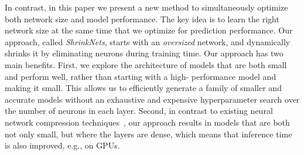 In contrast, in this paper we present a new method to simultaneously optimize
both network size and model performance. The key idea is to learn the right
network size at the same time that we optimize for prediction performance. Our
approach, called {\it ShrinkNets}, starts with an {\it oversized} network, and
dynamically shrinks it by eliminating neurons during training time.  Our
approach has two main benefits.  First, we explore the architecture of models
that are both small and perform well, rather than starting with a high-
performance model and making it small.  This allows us to efficiently generate
a family of smaller and accurate models without an exhaustive and expensive
hyperparameter search over the number of neurons in each layer. Second, in
contrast to existing neural network compression techniques~\cite{brain-
damage,han2015deepcompression}, our approach results in models that are both
not only small, but where the  layers are dense, which means that inference
time is also improved, e.g., on GPUs.



